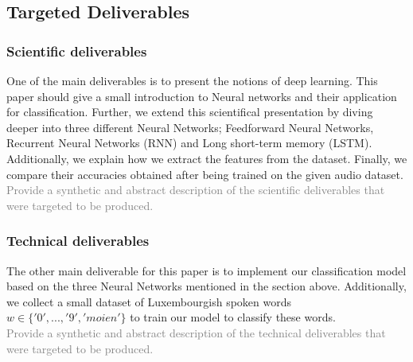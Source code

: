 \subsection{Targeted Deliverables}

\subsubsection{Scientific deliverables}



One of the main deliverables is to present the notions of deep learning. This
paper should give a small introduction to Neural networks and their application
for classification. Further, we extend this scientifical presentation by diving
deeper into three different Neural Networks; Feedforward Neural Networks,
Recurrent Neural Networks (RNN) and Long short-term memory (LSTM). Additionally,
we explain how we extract the features from the dataset. Finally, we compare
their accuracies obtained after being trained on the given audio dataset.\\

\textcolor{gray}{Provide a synthetic and abstract description of the scientific
deliverables that were targeted to be produced.}

\subsubsection{Technical deliverables} 

The other main deliverable for this paper is to implement our classification
model based on the three Neural Networks mentioned in the section above.
Additionally, we collect a small dataset of Luxembourgish spoken words $w \in
\{'0',...,'9','moien'\}$ to train our model to classify these words.\\ 

\textcolor{gray}{Provide a synthetic and abstract description of the technical
deliverables that were targeted to be produced.}
